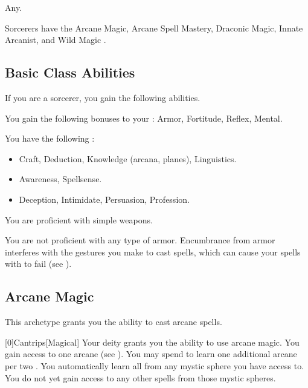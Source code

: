      Any.

     Sorcerers have the Arcane Magic, Arcane Spell Mastery, Draconic Magic, Innate Arcanist, and Wild Magic .

    \subsection{Basic Class Abilities}
        If you are a sorcerer, you gain the following abilities.

        You gain the following bonuses to your :  Armor,  Fortitude,  Reflex,  Mental.

        You have the following :
        \begin{itemize}
            \item {} Craft, Deduction, Knowledge (arcana, planes), Linguistics.
            \item {} Awareness, Spellsense.
            \item {} Deception, Intimidate, Persuasion, Profession.
        \end{itemize}

        You are proficient with simple weapons.

        You are not proficient with any type of armor.
        Encumbrance from armor interferes with the gestures you make to cast spells, which can cause your spells with  to fail (see ).

    \newpage
    \subsection{Arcane Magic}
        This archetype grants you the ability to cast arcane spells.

        [0]{Cantrips}[Magical]
        Your deity grants you the ability to use arcane magic.
        You gain access to one arcane  (see ).
        You may spend  to learn one additional arcane  per two .
        You automatically learn all  from any mystic sphere you have access to.
        You do not yet gain access to any other spells from those mystic spheres.

